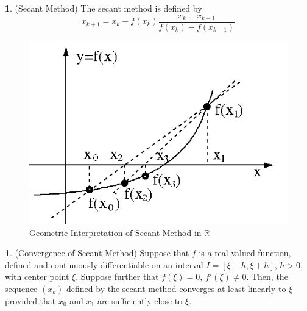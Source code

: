 \documentclass[12pt]{article}
\theoremstyle{definition}
\newtheorem{definition}{\color{NavyBlue}{\textbf{Definition}}}
\newcommand{\R}{\mathbb{R}}
\newtheorem{theorem}{\color{ForestGreen}{\textbf{Theorem}}}
\theoremstyle{definition}
\begin{document}
\begin{definition}(Secant Method)
The secant method is defined by 
\begin{equation}
	x_{k+1} = x_k - f(x_k) \frac{x_k - x_{k-1}}{f(x_k) - f(x_{k-1})}
\end{equation}
\end{definition}

\begin{figure}[H]
	\begin{center}
		\includegraphics[scale=.5]{secant_method.png}
	\end{center}
	\caption{Geometric Interpretation of Secant Method in $\R$}
\end{figure}

\begin{theorem}(Convergence of Secant Method)
Suppose that $f$ is a real-valued function, defined and continuously differentiable on an interval $I = [\xi - h, \xi + h]$, $h > 0$, with center point $\xi$. Suppose further that $f(\xi) = 0$, $f'(\xi) \neq 0$. Then, the sequence $(x_k)$ defined by the secant method converges at least linearly to $\xi$ provided that $x_0$ and $x_1$ are sufficiently close to $\xi$. 
\end{theorem}
\end{document}
